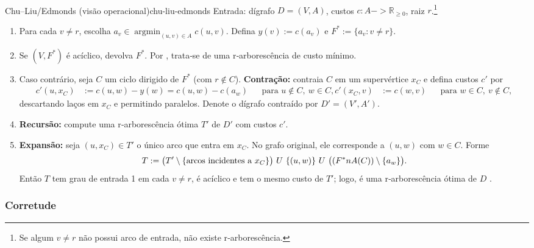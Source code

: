 \documentclass[12pt,a4paper]{article}
\def\\{}%
\def\cup{\string U}%
\def\cap{\string n}%
\def\to{->}%
\begin{document}
\paragraph{}
\begin{algobox}{Chu–Liu/Edmonds (visão operacional)}{chu-liu-edmonds}
Entrada: dígrafo \(D=(V,A)\), custos \(c:A\to\mathbb{R}_{\ge 0}\), raiz \(r\).\footnote{Se algum \(v\neq r\) não possui arco de entrada, não existe r‑arborescência.}
\begin{enumerate}\setlength{\itemsep}{2pt}
    \item Para cada \(v\neq r\), escolha \(a_v\in\operatorname*{argmin}_{(u,v)\in A} c(u,v)\). Defina \(y(v):=c(a_v)\) e \(F^*:=\{a_v: v\neq r\}.\)
    \item Se \((V,F^*)\) é acíclico, devolva \(F^*\). Por \cite[Obs.~4.36]{kleinberg2006}, trata‑se de uma r‑arborescência de custo mínimo.
    \item Caso contrário, seja \(C\) um ciclo dirigido de \(F^*\) (com \(r\notin C\)). \textbf{Contração:} contraia \(C\) em um supervértice \(x_C\) e defina custos \(c'\) por
    \begin{align*}
        c'(u,x_C) &:= c(u,w) - y(w) = c(u,w) - c(a_w) && \text{para } u\notin C,\ w\in C, \\
        c'(x_C,v) &:= c(w,v) && \text{para } w\in C,\ v\notin C,
    \end{align*}
    descartando laços em \(x_C\) e permitindo paralelos. Denote o dígrafo contraído por \(D'=(V',A')\).
    \item \textbf{Recursão:} compute uma r‑arborescência ótima \(T'\) de \(D'\) com custos \(c'\).
    \item \textbf{Expansão:} seja \((u,x_C)\in T'\) o único arco que entra em \(x_C\). No grafo original, ele corresponde a \((u,w)\) com \(w\in C\). Forme
    \[
        T := \bigl(T'\setminus\{\text{arcos incidentes a } x_C\}\bigr)\ \cup\ \{(u,w)\}\ \cup\ \bigl((F^*\cap A(C))\setminus\{a_w\}\bigr).
    \]
    Então \(T\) tem grau de entrada 1 em cada \(v\neq r\), é acíclico e tem o mesmo custo de \(T'\); logo, é uma r‑arborescência ótima de \(D\) \cite[Sec.~4.9]{kleinberg2006,schrijver2003comb}.
\end{enumerate}
\end{algobox}

\subsubsection{Corretude}
\end{document}
